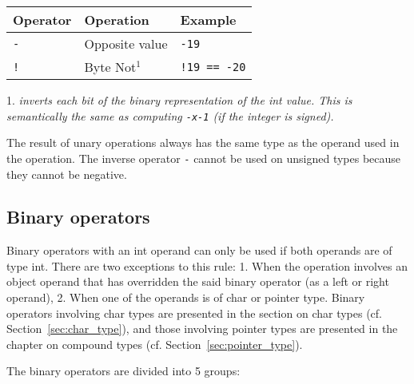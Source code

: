 \begin{center}
  \vspace{-5pt}
  \begin{threeparttable}
    \begin{tabular}{|l|ll|}
      \hline
      Operator & Operation & Example\\[0pt]
      \hline
      \hline
      \texttt{-} & Opposite value & \texttt{-19}\\[0pt]
      \hline
      \texttt{!} & Byte Not\(^{1}\) & \texttt{!19 == -20}\\[0pt]
      \hline
    \end{tabular}
    \begin{tablenotes}

    \item[1.] \footnotesize \textit{inverts each bit of the binary
      representation of the int value. This is semantically the same as
      computing \texttt{-x-1} (if the integer is signed).}

    \end{tablenotes}
  \end{threeparttable}
\end{center}

The result of unary operations always has the same type as the operand used in
the operation. The inverse operator \texttt{-} cannot be used on unsigned types
because they cannot be negative.


\subsection{Binary operators}
\label{sec:orgb91194f}

Binary operators with an int operand can only be used if both operands are of
type int. There are two exceptions to this rule: 1. When the operation involves
an object operand that has overridden the said binary operator (as a left or
right operand), 2. When one of the operands is of char or pointer type. Binary
operators involving char types are presented in the section on char types
(cf. Section~\ref{sec:char_type}), and those involving pointer types are presented in
the chapter on compound types (cf. Section~\ref{sec:pointer_type}).

The binary operators are divided into 5 groups:

